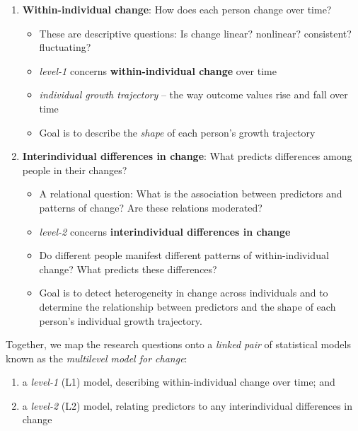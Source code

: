 \documentclass[
  11pt,
]{book}
\providecommand{\tightlist}{%
  \setlength{\itemsep}{0pt}\setlength{\parskip}{0pt}}
\begin{document}
\begin{enumerate}
\def\labelenumi{\arabic{enumi}.}
\tightlist
\item
  \textbf{Within-individual change}: How does each person change over time?

  \begin{itemize}
  \tightlist
  \item
    These are descriptive questions: Is change linear? nonlinear? consistent? fluctuating?
  \item
    \emph{level-1} concerns \textbf{within-individual change} over time
  \item
    \emph{individual growth trajectory} -- the way outcome values rise and fall over time
  \item
    Goal is to describe the \emph{shape} of each person's growth trajectory
  \end{itemize}
\item
  \textbf{Interindividual differences in change}: What predicts differences among people in their changes?

  \begin{itemize}
  \tightlist
  \item
    A relational question: What is the association between predictors and patterns of change? Are these relations moderated?
  \item
    \emph{level-2} concerns \textbf{interindividual differences in change}
  \item
    Do different people manifest different patterns of within-individual change? What predicts these differences?
  \item
    Goal is to detect heterogeneity in change across individuals and to determine the relationship between predictors and the shape of each person's individual growth trajectory.
  \end{itemize}
\end{enumerate}

Together, we map the research questions onto a \emph{linked pair} of statistical models known as the \emph{multilevel model for change}:

\begin{enumerate}
\def\labelenumi{\arabic{enumi}.}
\tightlist
\item
  a \emph{level-1} (L1) model, describing within-individual change over time; and
\item
  a \emph{level-2} (L2) model, relating predictors to any interindividual differences in change
\end{enumerate}
\end{document}
